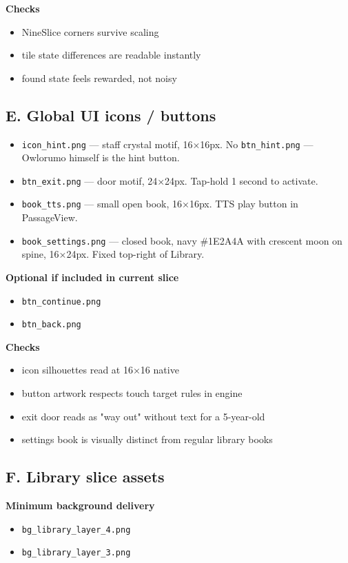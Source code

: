 \documentclass[11pt,a4paper]{article}
\newcommand{\checkbox}{\ensuremath{\square}}
\begin{document}
\textbf{Checks}
\begin{itemize}
  \item[\checkbox] NineSlice corners survive scaling
  \item[\checkbox] tile state differences are readable instantly
  \item[\checkbox] found state feels rewarded, not noisy
\end{itemize}

\subsection*{E. Global UI icons / buttons}
\begin{itemize}
  \item[\checkbox] \texttt{icon\_hint.png} — staff crystal motif, 16×16px.
    No \texttt{btn\_hint.png} — Owlorumo himself is the hint button.
  \item[\checkbox] \texttt{btn\_exit.png} — door motif, 24×24px. Tap-hold 1 second to activate.
  \item[\checkbox] \texttt{book\_tts.png} — small open book, 16×16px. TTS play button in PassageView.
  \item[\checkbox] \texttt{book\_settings.png} — closed book, navy \#1E2A4A with crescent moon on spine, 16×24px. Fixed top-right of Library.
\end{itemize}

\textbf{Optional if included in current slice}
\begin{itemize}
  \item[\checkbox] \texttt{btn\_continue.png}
  \item[\checkbox] \texttt{btn\_back.png}
\end{itemize}

\textbf{Checks}
\begin{itemize}
  \item[\checkbox] icon silhouettes read at 16×16 native
  \item[\checkbox] button artwork respects touch target rules in engine
  \item[\checkbox] exit door reads as "way out" without text for a 5-year-old
  \item[\checkbox] settings book is visually distinct from regular library books
\end{itemize}

\subsection*{F. Library slice assets}
\textbf{Minimum background delivery}
\begin{itemize}
  \item[\checkbox] \texttt{bg\_library\_layer\_4.png}
  \item[\checkbox] \texttt{bg\_library\_layer\_3.png}
\end{itemize}
\end{document}
